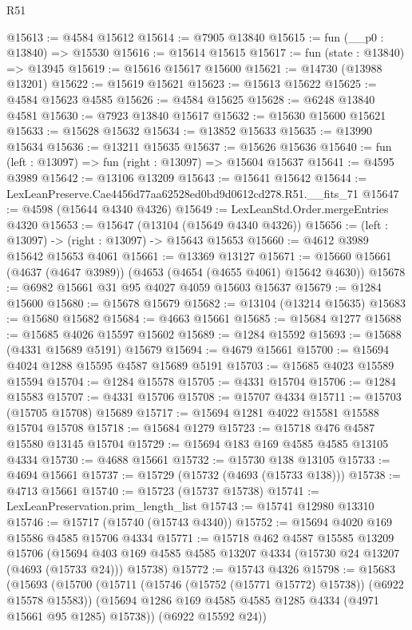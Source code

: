 \begin{lexlean}{R51}
\begin{coremodule}
@15613 := @4584 @15612
@15614 := @7905 @13840
@15615 := fun (__p0 : @13840) => @15530
@15616 := @15614 @15615
@15617 := fun (state : @13840) => @13945
@15619 := @15616 @15617 @15600
@15621 := @14730 (@13988 @13201)
@15622 := @15619 @15621
@15623 := @15613 @15622
@15625 := @4584 @15623 @4585
@15626 := @4584 @15625
@15628 := @6248 @13840 @4581
@15630 := @7923 @13840 @15617
@15632 := @15630 @15600 @15621
@15633 := @15628 @15632
@15634 := @13852 @15633
@15635 := @13990 @15634
@15636 := @13211 @15635
@15637 := @15626 @15636
@15640 := fun (left : @13097) => fun (right : @13097) => @15604 @15637
@15641 := @4595 @3989
@15642 := @13106 @13209
@15643 := @15641 @15642
@15644 := LexLeanPreserve.Cae4456d77aa62528ed0bd9d0612cd278.R51.__fits_71
@15647 := @4598 (@15644 @4340 @4326)
@15649 := LexLeanStd.Order.mergeEntries @4320
@15653 := @15647 (@13104 (@15649 @4340 @4326))
@15656 := (left : @13097) -> (right : @13097) -> @15643 @15653
@15660 := @4612 @3989 @15642 @15653 @4061
@15661 := @13369 @13127
@15671 := @15660 @15661 (@4637 (@4647 @3989)) (@4653 (@4654 (@4655 @4061) @15642 @4630))
@15678 := @6982 @15661 @31 @95 @4027 @4059 @15603 @15637
@15679 := @1284 @15600
@15680 := @15678 @15679
@15682 := @13104 (@13214 @15635)
@15683 := @15680 @15682
@15684 := @4663 @15661
@15685 := @15684 @1277
@15688 := @15685 @4026 @15597 @15602
@15689 := @1284 @15592
@15693 := @15688 (@4331 @15689 @5191) @15679
@15694 := @4679 @15661
@15700 := @15694 @4024 @1288 @15595 @4587 @15689 @5191
@15703 := @15685 @4023 @15589 @15594
@15704 := @1284 @15578
@15705 := @4331 @15704
@15706 := @1284 @15583
@15707 := @4331 @15706
@15708 := @15707 @4334
@15711 := @15703 (@15705 @15708) @15689
@15717 := @15694 @1281 @4022 @15581 @15588 @15704 @15708
@15718 := @15684 @1279
@15723 := @15718 @476 @4587 @15580 @13145 @15704
@15729 := @15694 @183 @169 @4585 @4585 @13105 @4334
@15730 := @4688 @15661
@15732 := @15730 @138 @13105
@15733 := @4694 @15661
@15737 := @15729 (@15732 (@4693 (@15733 @138)))
@15738 := @4713 @15661
@15740 := @15723 (@15737 @15738)
@15741 := LexLeanPreservation.prim_length_list
@15743 := @15741 @12980 @13310
@15746 := @15717 (@15740 (@15743 @4340))
@15752 := @15694 @4020 @169 @15586 @4585 @15706 @4334
@15771 := @15718
    @462
    @4587
    @15585
    @13209
    @15706
    (@15694 @403 @169 @4585 @4585 @13207 @4334 (@15730 @24 @13207 (@4693 (@15733 @24))) @15738)
@15772 := @15743 @4326
@15798 := @15683
    (@15693
      (@15700
        (@15711 (@15746 (@15752 (@15771 @15772) @15738)) (@6922 @15578 @15583))
        (@15694 @1286 @169 @4585 @4585 @1285 @4334 (@4971 @15661 @95 @1285) @15738))
      (@6922 @15592 @24))

\end{coremodule}
\end{lexlean}
